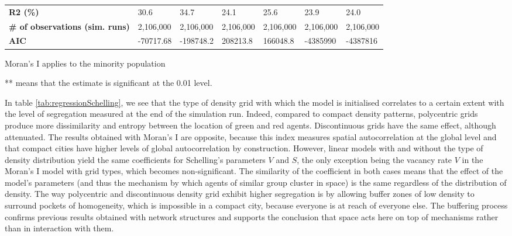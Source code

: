 \documentclass[3p,times,procedia]{elsarticle}
\begin{document}
\begin{table}[]
\begin{threeparttable}
\begin{tabular}{|m{2.5cm}|ll|ll|ll|}
\textbf{R2 (\%)}                            & 30.6       & 34.7                             & 24.1              & 25.6              & 23.9                 & 24.0                    \\ 
\textbf{\# of observations (sim. runs)}     & 2,106,000  & 2,106,000 						 & 2,106,000          & 2,106,000          & 2,106,000             & 2,106,000                \\ 
\textbf{AIC}                                & -70717.68   & -198748.2  						& 208213.8          & 166048.8          & -4385990             & -4387816                 \\ \hline
\end{tabular}
\begin{tablenotes}
 \item Moran's I applies to the minority population
 \item *** means that the estimate is significant at the 0.01 level.
\end{tablenotes}
  \end{threeparttable}
\end{table}

In table \ref{tab:regressionSchelling}, we see that the type of density grid with which the model is initialised correlates to a certain extent with the level of segregation measured at the end of the simulation run. Indeed, compared to compact density patterns, polycentric grids produce more dissimilarity and entropy between the location of green and red agents. Discontinuous grids have the same effect, although attenuated. The results obtained with Moran's I are opposite, because this index measures spatial autocorrelation at the global level and that compact cities have higher levels of global autocorrelation by construction. However, linear models with and without the type of density distribution yield the same coefficients for Schelling's parameters $V$ and $S$, the only exception being the vacancy rate $V$ in the Moran's I model with grid types, which becomes non-significant. The similarity of the coefficient in both cases means that the effect of the model's parameters (and thus the mechanism by which agents of similar group cluster in space) is the same regardless of the distribution of density. The way polycentric and discontinuous density grid exhibit higher segregation is by allowing buffer zones of low density to surround pockets of homogeneity, which is impossible in a compact city, because everyone is at reach of everyone else. The buffering process confirms previous results obtained with network structures \citep{Banos2012} and supports the conclusion that space acts here on top of mechanisms rather than in interaction with them.
\end{document}
